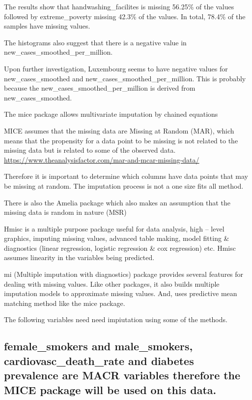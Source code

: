 \documentclass[
]{article}
\begin{document}
The results show that handwashing\_facilites is missing 56.25\% of the values followed by extreme\_poverty missing 42.3\% of the values. In total, 78.4\% of the samples have missing values.

The histograms also suggest that there is a negative value in new\_cases\_smoothed\_per\_million.

Upon further investigation, Luxembourg seems to have negative values for new\_cases\_smoothed and new\_cases\_smoothed\_per\_million. This is probably because the new\_cases\_smoothed\_per\_million is derived from new\_cases\_smoothed.

The mice package allows multivariate imputation by chained equations

MICE assumes that the missing data are Missing at Random (MAR), which means that the propensity for a data point to be missing is not related to the missing data but is related to some of the observed data.
\url{https://www.theanalysisfactor.com/mar-and-mcar-missing-data/}

Therefore it is important to determine which columns have data points that may be missing at random. The imputation process is not a one size fits all method.

There is also the Amelia package which also makes an assumption that the missing data is random in nature (MSR)

Hmisc is a multiple purpose package useful for data analysis, high -- level graphics, imputing missing values, advanced table making, model fitting \& diagnostics (linear regression, logistic regression \& cox regression) etc. Hmisc assumes linearity in the variables being predicted.

mi (Multiple imputation with diagnostics) package provides several features for dealing with missing values. Like other packages, it also builds multiple imputation models to approximate missing values. And, uses predictive mean matching method like the mice package.

The following variables need need impiutation using some of the methods.

\hypertarget{female_smokers-and-male_smokers-cardiovasc_death_rate-and-diabetes-prevalence-are-macr-variables-therefore-the-mice-package-will-be-used-on-this-data.}{%
\subsection{female\_smokers and male\_smokers, cardiovasc\_death\_rate and diabetes prevalence are MACR variables therefore the MICE package will be used on this data.}\label{female_smokers-and-male_smokers-cardiovasc_death_rate-and-diabetes-prevalence-are-macr-variables-therefore-the-mice-package-will-be-used-on-this-data.}}
\end{document}
